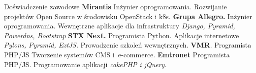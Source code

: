 \begin{rubric}{Doświadczenie zawodowe}
\textbf{Mirantis}\newline
    Inżynier oprogramowania.\newline
    Rozwijanie projektów Open Source w środowisku OpenStack i k8s.
\entry*[X 2013 -- II 2016]\textbf{Grupa Allegro.}\newline
    Inżynier oprogramowania.\newline
    Wewnętrzne aplikacje dla infrastruktury\newline
    \textit{Django, Pyramid, Powerdns, Bootstrap}
\entry*[V 2011 -- IX 2013]\textbf{STX Next.}\newline
    Programista Python.\newline
    Aplikacje internetowe \newline
    \textit{Pylons, Pyramid, ExtJS.}\newline
    Prowadzenie szkoleń wewnętrznych.
\entry*[XII 2009 -- IV 2011]\textbf{VMR}.
    Programista PHP/JS\newline
    Tworzenie systemów CMS i~\hbox{e-commerce}.
\entry*[VI 2009 -- XII 2009]\textbf{Emtronet} Programista PHP/JS.\newline
    Programowanie aplikacji\newline
    \textit{cakePHP i jQuery.}
\end{rubric}
